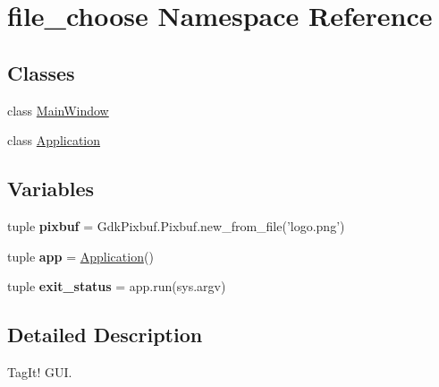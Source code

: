\hypertarget{namespacefile__choose}{\section{file\-\_\-choose Namespace Reference}
\label{namespacefile__choose}
}
\subsection*{Classes}
\begin{DoxyCompactItemize}
\item 
class \hyperlink{classfile__choose_1_1MainWindow}{Main\-Window}
\item 
class \hyperlink{classfile__choose_1_1Application}{Application}
\end{DoxyCompactItemize}
\subsection*{Variables}
\begin{DoxyCompactItemize}
\item 
\hypertarget{namespacefile__choose_aaf648f7b09af7494312577df74bba168}{tuple {\bfseries pixbuf} = Gdk\-Pixbuf.\-Pixbuf.\-new\-\_\-from\-\_\-file('logo.\-png')}\label{namespacefile__choose_aaf648f7b09af7494312577df74bba168}

\item 
\hypertarget{namespacefile__choose_aa2d3b0b2216329fa149f6853e42a1b23}{tuple {\bfseries app} = \hyperlink{classfile__choose_1_1Application}{Application}()}\label{namespacefile__choose_aa2d3b0b2216329fa149f6853e42a1b23}

\item 
\hypertarget{namespacefile__choose_a666b7d2d723a67034fdb354b866fd30b}{tuple {\bfseries exit\-\_\-status} = app.\-run(sys.\-argv)}\label{namespacefile__choose_a666b7d2d723a67034fdb354b866fd30b}

\end{DoxyCompactItemize}


\subsection{Detailed Description}
\begin{DoxyVerb}    TagIt! GUI.
\end{DoxyVerb}
 